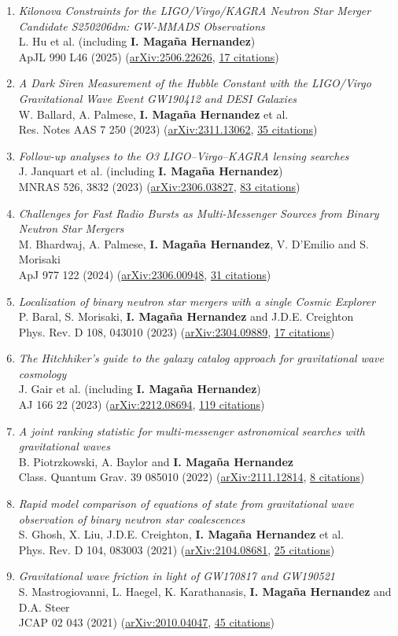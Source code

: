 \documentclass[letterpaper,10pt]{article}
\newcommand{\publicationJournal}[6]{%
\emph{#1}\\
#2\\
#3 (\href{#4}{#5}, \underline{#6 citations})}
\begin{document}
\begin{enumerate}
\item
    \publicationJournal{Kilonova Constraints for the LIGO/Virgo/KAGRA Neutron Star Merger Candidate S250206dm: GW-MMADS Observations
}{L. Hu et al. (including \textbf{I. Maga\~na Hernandez})}{ApJL 990 L46 (2025)}{https://arxiv.org/abs/2506.22626}{arXiv:2506.22626}{17}
\item 
    \publicationJournal{A Dark Siren Measurement of the Hubble Constant with the LIGO/Virgo Gravitational Wave Event GW190412 and DESI Galaxies
}{W. Ballard, A. Palmese, \textbf{I. Maga\~na Hernandez} et al. }{Res. Notes AAS 7 250 (2023)}{https://arxiv.org/abs/2311.13062}{arXiv:2311.13062}{35}
\item
    \publicationJournal{Follow-up analyses to the O3 LIGO–Virgo–KAGRA lensing searches
}{J. Janquart et al. (including \textbf{I. Maga\~na Hernandez})}{MNRAS 526, 3832 (2023)}{https://arxiv.org/abs/2306.03827}{arXiv:2306.03827}{83}
\item 
    \publicationJournal{Challenges for Fast Radio Bursts as Multi-Messenger Sources from Binary Neutron Star Mergers}{M. Bhardwaj, A. Palmese, {\textbf{I. Maga\~na Hernandez}}, V. D'Emilio and S. Morisaki}{ApJ 977 122 (2024)}{https://arxiv.org/abs/2306.00948}{arXiv:2306.00948}{31}
\item
    \publicationJournal{Localization of binary neutron star mergers with a single Cosmic Explorer}{P. Baral, S. Morisaki, \textbf{I. Maga\~na Hernandez} and J.D.E. Creighton}{Phys. Rev. D 108, 043010 (2023)}{https://arxiv.org/abs/2304.09889}{arXiv:2304.09889}{17}
\item
    \publicationJournal{The Hitchhiker's guide to the galaxy catalog approach for gravitational wave cosmology}{J. Gair et al. (including \textbf{I. Maga\~na Hernandez})}{AJ 166 22 (2023)}{https://arxiv.org/abs/2212.08694}{arXiv:2212.08694}{119}
\item 
    \publicationJournal{A joint ranking statistic for multi-messenger astronomical searches with gravitational waves}{B. Piotrzkowski, A. Baylor and \textbf{I. Maga\~na Hernandez}}{Class. Quantum Grav. 39 085010 (2022)}{https://arxiv.org/abs/2111.12814}{arXiv:2111.12814}{8}
\item
    \publicationJournal{Rapid model comparison of equations of state from gravitational wave observation of binary neutron star coalescences}{S. Ghosh, X. Liu, J.D.E. Creighton, \textbf{I. Maga\~na Hernandez} et al.}{Phys. Rev. D 104, 083003 (2021)}{https://arxiv.org/abs/2104.08681}{arXiv:2104.08681}{25}
\item
    \publicationJournal{Gravitational wave friction in light of GW170817 and GW190521}{S. Mastrogiovanni, L. Haegel, K. Karathanasis, \textbf{I. Maga\~na Hernandez} and D.A. Steer}{JCAP 02 043 (2021)}{https://arxiv.org/abs/2010.04047}{arXiv:2010.04047}{45}

\end{enumerate}
\end{document}
